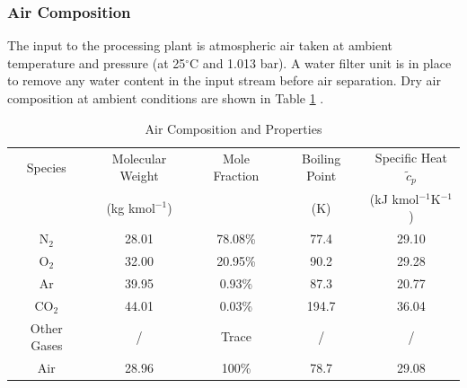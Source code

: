 	\subsubsection{Air Composition} \noindent
    The input to the processing plant is atmospheric air taken at ambient temperature and pressure (at 25$^\circ$C and 1.013 bar). A water filter unit is in place to remove any water content in the input stream before air separation. Dry air composition at ambient conditions are shown in Table \ref{table:air_properties} \citep{hands1986,barron1985,HLT}.
    \begin{table}[ht]
        \singlespacing
	    \centering
	    \caption{Air Composition and Properties}
	    \label{table:air_properties}
        
	    \begin{tabular}{|c|cccc|}
	    \hline
	    Species 	& Molecular Weight	& Mole Fraction & Boiling Point 	& Specific Heat $\tilde{c}_p$ \\
                    & (kg kmol$^{-1}$)    &               & (K)               & (kJ kmol$^{-1}$K$^{-1}$)\\
	    \hline
	    N$_2$		& 28.01				& 78.08\%		& 77.4				& 29.10 \\  
	    O$_2$		& 32.00				& 20.95\%		& 90.2				& 29.28 \\  
	    Ar			& 39.95				& 0.93\%		& 87.3				& 20.77 \\  
	    CO$_2$		& 44.01				& 0.03\%		& 194.7            & 36.04 \\  
	    Other Gases & /              	& Trace	    	& /                & /     \\  \hline
	    Air         & 28.96             & 100\%         & 78.7             & 29.08 \\ \hline
	    \end{tabular}
    \end{table}

